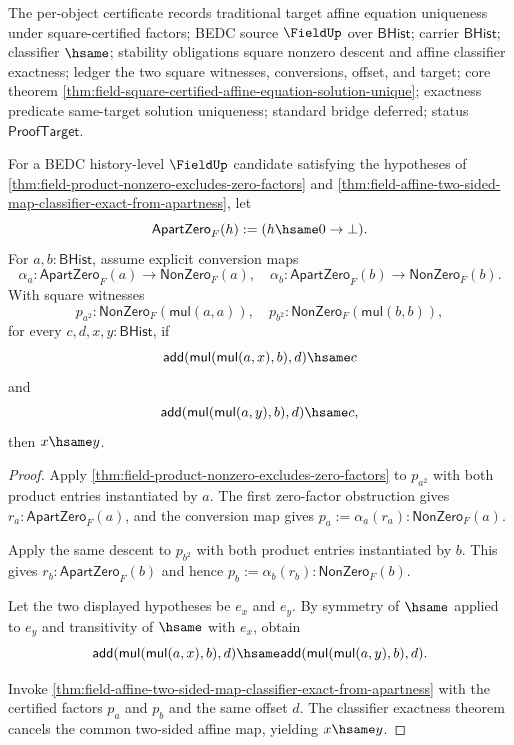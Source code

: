 The per-object certificate records traditional target affine equation
uniqueness under square-certified factors; BEDC source $\FieldUp$ over
$\mathsf{BHist}$; carrier $\mathsf{BHist}$; classifier $\hsame$; stability
obligations square nonzero descent and affine classifier exactness; ledger the
two square witnesses, conversions, offset, and target; core theorem
\autoref{thm:field-square-certified-affine-equation-solution-unique};
exactness predicate same-target solution uniqueness; standard bridge deferred;
status $\mathsf{ProofTarget}$.

\begin{theorem}
\label{thm:field-square-certified-affine-equation-solution-unique}
For a BEDC history-level $\FieldUp$ candidate satisfying the hypotheses of
\autoref{thm:field-product-nonzero-excludes-zero-factors} and
\autoref{thm:field-affine-two-sided-map-classifier-exact-from-apartness}, let
$$
\mathsf{ApartZero}_F(h) := (h\hsame0\to\bot).
$$
For $a,b:\mathsf{BHist}$, assume explicit conversion maps
$$
\alpha_a:\mathsf{ApartZero}_F(a)\to\mathsf{NonZero}_F(a),
\quad
\alpha_b:\mathsf{ApartZero}_F(b)\to\mathsf{NonZero}_F(b).
$$
With square witnesses
$$
p_{a^2}:\mathsf{NonZero}_F(\mathsf{mul}(a,a)),
\quad
p_{b^2}:\mathsf{NonZero}_F(\mathsf{mul}(b,b)),
$$
for every $c,d,x,y:\mathsf{BHist}$, if
$$
\mathsf{add}(\mathsf{mul}(\mathsf{mul}(a,x),b),d)\hsame c
$$
and
$$
\mathsf{add}(\mathsf{mul}(\mathsf{mul}(a,y),b),d)\hsame c,
$$
then $x\hsame y$.
\end{theorem}
\begin{proof}
Apply \autoref{thm:field-product-nonzero-excludes-zero-factors} to
$p_{a^2}$ with both product entries instantiated by $a$. The first
zero-factor obstruction gives $r_a:\mathsf{ApartZero}_F(a)$, and the
conversion map gives $p_a:=\alpha_a(r_a):\mathsf{NonZero}_F(a)$.

Apply the same descent to $p_{b^2}$ with both product entries instantiated by
$b$. This gives $r_b:\mathsf{ApartZero}_F(b)$ and hence
$p_b:=\alpha_b(r_b):\mathsf{NonZero}_F(b)$.

Let the two displayed hypotheses be $e_x$ and $e_y$. By symmetry of
$\hsame$ applied to $e_y$ and transitivity of $\hsame$ with $e_x$, obtain
$$
\mathsf{add}(\mathsf{mul}(\mathsf{mul}(a,x),b),d)\hsame
\mathsf{add}(\mathsf{mul}(\mathsf{mul}(a,y),b),d).
$$

Invoke
\autoref{thm:field-affine-two-sided-map-classifier-exact-from-apartness} with
the certified factors $p_a$ and $p_b$ and the same offset $d$. The classifier
exactness theorem cancels the common two-sided affine map, yielding
$x\hsame y$.
\end{proof}
